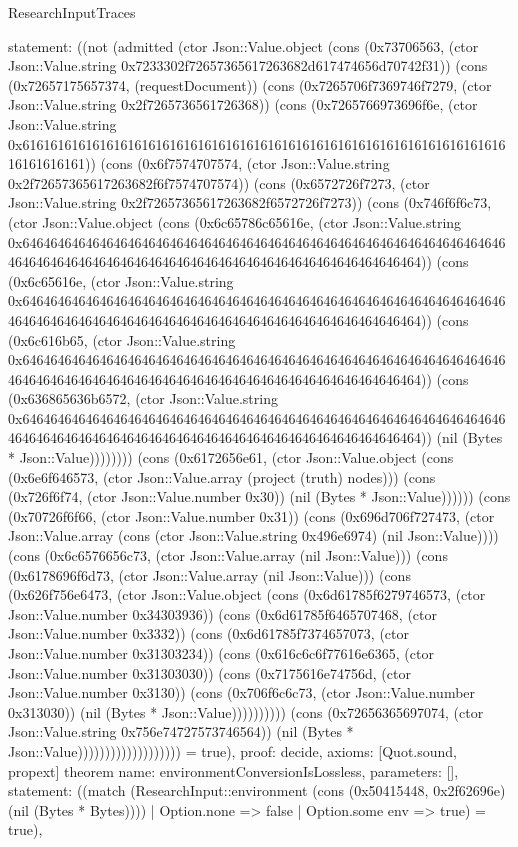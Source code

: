 \begin{lexlean}{ResearchInputTraces}
\begin{semanticmodule}
{ statement: ((not (admitted (ctor Json::Value.object (cons (0x73706563, (ctor Json::Value.string 0x7233302f72657365617263682d617474656d70742f31)) (cons (0x72657175657374, (requestDocument)) (cons (0x7265706f7369746f7279, (ctor Json::Value.string 0x2f7265736561726368)) (cons (0x7265766973696f6e, (ctor Json::Value.string 0x61616161616161616161616161616161616161616161616161616161616161616161616161616161)) (cons (0x6f7574707574, (ctor Json::Value.string 0x2f72657365617263682f6f7574707574)) (cons (0x6572726f7273, (ctor Json::Value.string 0x2f72657365617263682f6572726f7273)) (cons (0x746f6f6c73, (ctor Json::Value.object (cons (0x6c65786c65616e, (ctor Json::Value.string 0x64646464646464646464646464646464646464646464646464646464646464646464646464646464646464646464646464646464646464646464646464646464)) (cons (0x6c65616e, (ctor Json::Value.string 0x64646464646464646464646464646464646464646464646464646464646464646464646464646464646464646464646464646464646464646464646464646464)) (cons (0x6c616b65, (ctor Json::Value.string 0x64646464646464646464646464646464646464646464646464646464646464646464646464646464646464646464646464646464646464646464646464646464)) (cons (0x636865636b6572, (ctor Json::Value.string 0x64646464646464646464646464646464646464646464646464646464646464646464646464646464646464646464646464646464646464646464646464646464)) (nil (Bytes * Json::Value)))))))) (cons (0x6172656e61, (ctor Json::Value.object (cons (0x6e6f646573, (ctor Json::Value.array (project (truth) nodes))) (cons (0x726f6f74, (ctor Json::Value.number 0x30)) (nil (Bytes * Json::Value)))))) (cons (0x70726f6f66, (ctor Json::Value.number 0x31)) (cons (0x696d706f727473, (ctor Json::Value.array (cons (ctor Json::Value.string 0x496e6974) (nil Json::Value)))) (cons (0x6c6576656c73, (ctor Json::Value.array (nil Json::Value))) (cons (0x6178696f6d73, (ctor Json::Value.array (nil Json::Value))) (cons (0x626f756e6473, (ctor Json::Value.object (cons (0x6d61785f6279746573, (ctor Json::Value.number 0x34303936)) (cons (0x6d61785f6465707468, (ctor Json::Value.number 0x3332)) (cons (0x6d61785f7374657073, (ctor Json::Value.number 0x31303234)) (cons (0x616c6c6f77616e6365, (ctor Json::Value.number 0x31303030)) (cons (0x7175616e74756d, (ctor Json::Value.number 0x3130)) (cons (0x706f6c6c73, (ctor Json::Value.number 0x313030)) (nil (Bytes * Json::Value)))))))))) (cons (0x72656365697074, (ctor Json::Value.string 0x756e74727573746564)) (nil (Bytes * Json::Value))))))))))))))))))) = true),
 proof: decide{},
 axioms: [Quot.sound, propext]
}
theorem{
 name: environmentConversionIsLossless,
 parameters: [],
 statement: ((match (ResearchInput::environment (cons (0x50415448, 0x2f62696e) (nil (Bytes * Bytes)))) | Option.none => false | Option.some env => true) = true),
}
\end{semanticmodule}
\end{lexlean}
